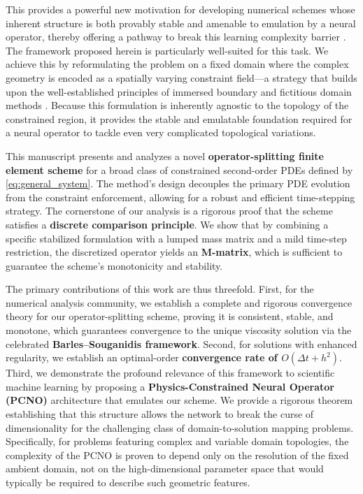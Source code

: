 \documentclass[pdflatex,sn-mathphys-num]{sn-jnl}%
\theoremstyle{thmstyleone}%
\numberwithin{equation}{section}
\begin{document}
This provides a powerful new motivation for developing numerical schemes whose inherent structure is both provably stable and amenable to emulation by a neural operator, thereby offering a pathway to break this learning complexity barrier \cite{herrmann2024neural}. The framework proposed herein is particularly well-suited for this task. We achieve this by reformulating the problem on a fixed domain where the complex geometry is encoded as a spatially varying constraint field—a strategy that builds upon the well-established principles of immersed boundary and fictitious domain methods \cite{peskin2002immersed,verzicco2023immersed,lui2009spectral}. Because this formulation is inherently agnostic to the topology of the constrained region, it provides the stable and emulatable foundation required for a neural operator to tackle even very complicated topological variations.

This manuscript presents and analyzes a novel \textbf{operator-splitting finite element scheme} for a broad class of constrained second-order PDEs defined by \eqref{eq:general_system}. The method's design decouples the primary PDE evolution from the constraint enforcement, allowing for a robust and efficient time-stepping strategy. The cornerstone of our analysis is a rigorous proof that the scheme satisfies a \textbf{discrete comparison principle}. We show that by combining a specific stabilized formulation with a lumped mass matrix and a mild time-step restriction, the discretized operator yields an \textbf{M-matrix}, which is sufficient to guarantee the scheme's monotonicity and stability.

The primary contributions of this work are thus threefold. First, for the numerical analysis community, we establish a complete and rigorous convergence theory for our operator-splitting scheme, proving it is consistent, stable, and monotone, which guarantees convergence to the unique viscosity solution via the celebrated \textbf{Barles--Souganidis framework}. Second, for solutions with enhanced regularity, we establish an optimal-order \textbf{convergence rate of $O(\Delta t + h^2)$}. Third, we demonstrate the profound relevance of this framework to scientific machine learning by proposing a \textbf{Physics-Constrained Neural Operator (PCNO)} architecture that emulates our scheme. We provide a rigorous theorem establishing that this structure allows the network to break the curse of dimensionality for the challenging class of domain-to-solution mapping problems. Specifically, for problems featuring complex and variable domain topologies, the complexity of the PCNO is proven to depend only on the resolution of the fixed ambient domain, not on the high-dimensional parameter space that would typically be required to describe such geometric features.
\end{document}

